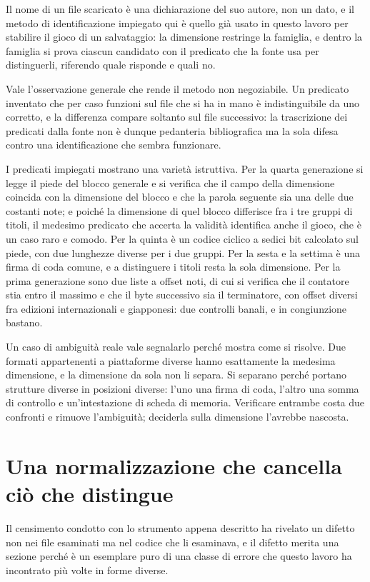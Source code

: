 Il nome di un file scaricato è una dichiarazione del suo autore, non un dato, e il metodo di identificazione impiegato qui è quello già usato in questo lavoro per stabilire il gioco di un salvataggio: la dimensione restringe la famiglia, e dentro la famiglia si prova ciascun candidato con il predicato che la fonte usa per distinguerli, riferendo quale risponde e quali no.

Vale l'osservazione generale che rende il metodo non negoziabile. Un predicato inventato che per caso funzioni sul file che si ha in mano è indistinguibile da uno corretto, e la differenza compare soltanto sul file successivo: la trascrizione dei predicati dalla fonte non è dunque pedanteria bibliografica ma la sola difesa contro una identificazione che sembra funzionare.

I predicati impiegati mostrano una varietà istruttiva. Per la quarta generazione si legge il piede del blocco generale e si verifica che il campo della dimensione coincida con la dimensione del blocco e che la parola seguente sia una delle due costanti note; e poiché la dimensione di quel blocco differisce fra i tre gruppi di titoli, il medesimo predicato che accerta la validità identifica anche il gioco, che è un caso raro e comodo. Per la quinta è un codice ciclico a sedici bit calcolato sul piede, con due lunghezze diverse per i due gruppi. Per la sesta e la settima è una firma di coda comune, e a distinguere i titoli resta la sola dimensione. Per la prima generazione sono due liste a offset noti, di cui si verifica che il contatore stia entro il massimo e che il byte successivo sia il terminatore, con offset diversi fra edizioni internazionali e giapponesi: due controlli banali, e in congiunzione bastano.

Un caso di ambiguità reale vale segnalarlo perché mostra come si risolve. Due formati appartenenti a piattaforme diverse hanno esattamente la medesima dimensione, e la dimensione da sola non li separa. Si separano perché portano strutture diverse in posizioni diverse: l'uno una firma di coda, l'altro una somma di controllo e un'intestazione di scheda di memoria. Verificare entrambe costa due confronti e rimuove l'ambiguità; deciderla sulla dimensione l'avrebbe nascosta.

\section{Una normalizzazione che cancella ciò che distingue}

Il censimento condotto con lo strumento appena descritto ha rivelato un difetto non nei file esaminati ma nel codice che li esaminava, e il difetto merita una sezione perché è un esemplare puro di una classe di errore che questo lavoro ha incontrato più volte in forme diverse.

